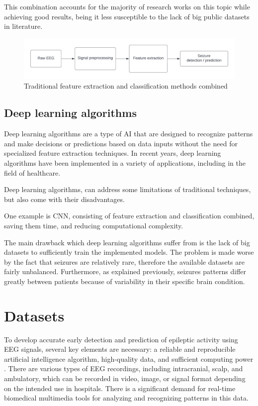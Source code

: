 This combination accounts for the majority of research works on this topic while achieving good results, being it less susceptible to the lack of big public datasets in literature.

\begin{figure}[ht]
    \centering
    \includegraphics[width=1.0\textwidth]{images/State-of-art/traditional-feature-extraction-classification.png}
    \caption{Traditional feature extraction and classification methods combined}
    \label{fig:traditional-feature-extraction-classification}
\end{figure}

\subsection{Deep learning algorithms}
Deep learning algorithms are a type of \gls{AI} that are designed to recognize patterns and make decisions or predictions based on data inputs without the need for specialized feature extraction techniques. In recent years, deep learning algorithms have been implemented in a variety of applications, including in the field of healthcare. 

Deep learning algorithms, can address some limitations of traditional techniques, but also come with their disadvantages. 

One example is \gls{CNN}, consisting of feature extraction and classification combined, saving them time, and reducing computational complexity.

The main drawback which deep learning algorithms suffer from is the lack of big datasets to sufficiently train the implemented models. The problem is made worse by the fact that seizures are relatively rare, therefore the available datasets are fairly unbalanced. Furthermore, as explained previously, seizures patterns differ greatly between patients because of variability in their specific brain condition.

\section{Datasets}
To develop accurate early detection and prediction of epileptic activity using \gls{EEG} signals, several key elements are necessary: a reliable and reproducible artificial intelligence algorithm, high-quality data, and sufficient computing power \cite{handa_open_2021}. There are various types of \gls{EEG} recordings, including intracranial, scalp, and ambulatory, which can be recorded in video, image, or signal format depending on the intended use in hospitals. There is a significant demand for real-time biomedical multimedia tools for analyzing and recognizing patterns in this data.

